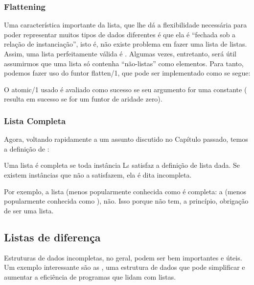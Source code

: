 \documentclass{article}
\begin{document}
\subsubsection{Flattening}

Uma característica importante da lista, que lhe dá a flexibilidade necessária para poder representar muitos tipos de dados diferentes
é que ela é ``fechada sob a relação de instanciação'', isto é, não existe problema em fazer uma lista de listas. Assim, uma lista
perfeitamente válida é \codigo{[[[a,b],c],[]]}. Algumas vezes, entretanto, será útil assumirmos que uma lista  só contenha ``não-listas'' como elementos. Para tanto, podemos fazer uso do funtor flatten/1, que pode ser implementado como se segue:



\noindent O atomic/1 usado é avaliado como sucesso se seu argumento for uma constante ( resulta em sucesso
se  for um funtor de aridade zero).


\subsubsection{Lista Completa}

Agora, voltando rapidamente a um assunto discutido no Capítulo passado, temos a definição de :

\begin{definition} Uma lista  é completa se toda instância L$\iota$ satisfaz a definição de lista dada. Se existem instâncias que não a satisfazem, ela é dita incompleta.
\end{definition}

Por exemplo, a lista \codigo{[a,b,c]} (menos popularmente conhecida como   é completa: a \codigo{[a,b|Xs]} (menos popularmente conhecida como  ), não. Isso porque  não tem, a princípio, obrigação de ser uma lista.



\subsection{Listas de diferença}

Estruturas de dados incompletas, no geral, podem ser bem importantes e úteis. Um exemplo interessante são as , uma estrutura de dados que pode simplificar e aumentar a eficiência de programas que lidam com listas.
\end{document}
